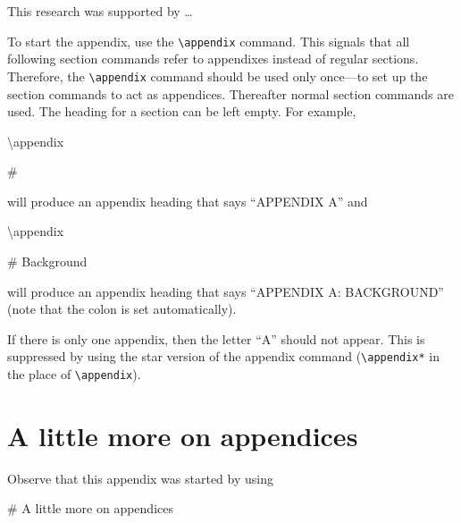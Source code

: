 \documentclass[preprint]{JASA}
\newenvironment{Shaded}{\begin{snugshade}}{\end{snugshade}}
\newcommand{\FunctionTok}[1]{\textcolor[rgb]{0.00,0.00,0.00}{#1}}
\newcommand{\NormalTok}[1]{#1}
\begin{document}
\begin{acknowledgments}
This research was supported by \ldots{}

\end{acknowledgments}

\appendix

To start the appendix, use the \texttt{\textbackslash{}appendix}
command. This signals that all following section commands refer to
appendixes instead of regular sections. Therefore, the
\texttt{\textbackslash{}appendix} command should be used only once---to
set up the section commands to act as appendices. Thereafter normal
section commands are used. The heading for a section can be left empty.
For example,

\begin{Shaded}
\begin{Highlighting}[]
\FunctionTok{\textbackslash{}appendix}

\NormalTok{\# }
\end{Highlighting}
\end{Shaded}

will produce an appendix heading that says ``APPENDIX A'' and

\begin{Shaded}
\begin{Highlighting}[]
\FunctionTok{\textbackslash{}appendix}

\NormalTok{\# Background}
\end{Highlighting}
\end{Shaded}

will produce an appendix heading that says ``APPENDIX A: BACKGROUND''
(note that the colon is set automatically).

If there is only one appendix, then the letter ``A'' should not appear.
This is suppressed by using the star version of the appendix command
(\texttt{\textbackslash{}appendix*} in the place of
\texttt{\textbackslash{}appendix}).

\hypertarget{a-little-more-on-appendices}{%
\section{A little more on
appendices}\label{a-little-more-on-appendices}}

Observe that this appendix was started by using

\begin{Shaded}
\begin{Highlighting}[]
\FunctionTok{\# A little more on appendices}
\end{Highlighting}
\end{Shaded}
\end{document}

